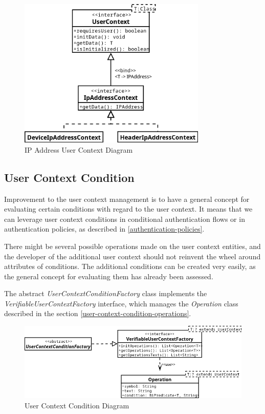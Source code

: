 \begin{figure}[htbp]
  \centering
  \includegraphics[width=0.8\textwidth]{img/sections/5-design/ipAddressContext.png}
  \caption{IP Address User Context Diagram}
  \label{fig:user-context-ip-address-context}
\end{figure}

\newpage

\subsection{User Context Condition}
Improvement to the user context management is to have a general concept for evaluating certain conditions with regard to the user context.
It means that we can leverage user context conditions in conditional authentication flows or in authentication policies, as described in \ref{authentication-policies}.

There might be several possible operations made on the user context entities, and the developer of the additional user context should not reinvent the wheel around attributes of conditions.
The additional conditions can be created very easily, as the general concept for evaluating them has already been assessed.

The abstract \textit{UserContextConditionFactory} class implements the \textit{VerifiableUserContextFactory} interface, which manages the \textit{Operation} class described in the section \ref{user-context-condition-operations}.

\begin{figure}[htbp]
  \centering
  \includegraphics[width=1\textwidth]{img/sections/5-design/UserContextCondition.png}
  \caption{User Context Condition Diagram}
  \label{fig:user-context-condition}
\end{figure}

